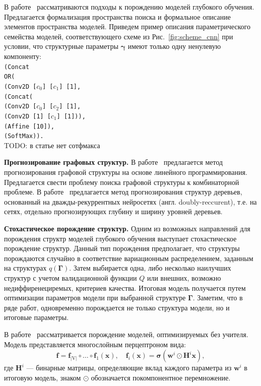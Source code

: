 В работе~\cite{search_space} рассматриваются подходы к порождению моделей глубокого обучения. Предлагается формализация пространства поиска и формальное описание элементов  пространства моделей. Приведем пример описания параметрического семейства моделей, соответствующего схеме из Рис.~\ref{fig:scheme_cnn} при условии, что структурные параметры $\boldsymbol{\gamma}$ имеют только одну ненулевую компоненту:\\
\texttt{(Concat\\
\text{\quad}OR(\\
\text{\quad\quad}(Conv2D [$c_0$] [$c_1$] [1],\\
\text{\quad\quad}(Concat(\\
\text{\quad\quad\quad}(Conv2D [$c_0$] [$c_2$] [1],\\
\text{\quad\quad\quad}(Conv2D [1] [$c_1$] [1])),\\
\text{\quad}(Affine [10]),\\
\text{\quad}(SoftMax)).} \\
TODO: в статье нет сотфмакса


\textbf{Прогнозирование графовых структур. }
В работе~\cite{jaakkola2010learning} предлагается метод прогнозирования графовой структуры на основе линейного программирования. Предлагается свести проблему поиска графовой структуры к комбинаторной проблеме.
В работе~\cite{double_rnn} предлагается метод прогнозирования структур деревьев, основанный на дважды-рекуррентных нейросетях (англ. doubly-reccurent), т.е. на сетях, отдельно прогнозирующих глубину и ширину уровней деревьев.

\par{\textbf{Стохастическое порождение структур. }}
Одним из возможных направлений для порождения структр моделей глубокого обучения выступает стохастическое порождение структур.
Данный тип порождения предполагает, что структуры порождаются случайно в соответствие  вариационным распределением, заданным на структурах $q(\boldsymbol{\Gamma})$. Затем выбирается одна, либо несколько наилучших структур с учетом валидационной функции $Q$ или внешних, возможно недиффиренециремых, критериев качества. Итоговая модель получается путем оптимизации параметров модели при выбранной структуре $\boldsymbol{\Gamma}$. 
Заметим, что в ряде работ, одновременно порождается не только структура модели, но и итоговые параметры.

В работе~\cite{cib} рассматривается порождение моделей, оптимизируемых без учителя. Модель представляется многослойным перцептроном вида:
\[
    \mathbf{f} = \mathbf{f}_\text{|V|} \circ \dots \circ \mathbf{f}_1 (\mathbf{x}), \quad \mathbf{f}_i(\mathbf{x}) = \boldsymbol{\sigma}(\mathbf{w}^i \odot \mathbf{H}^i \mathbf{x}),
\]
где $\mathbf{H}^i$ --- бинарные матрицы, определяющие вклад каждого параметра из $\mathbf{w}^i$ в итоговую модель, знаком $\odot$  обозначается покомпонентное перемножение. 

